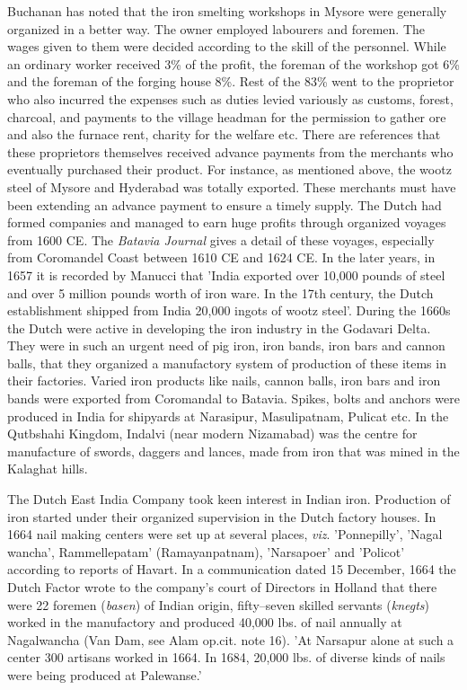 Buchanan has noted that the iron smelting workshops in Mysore were generally organized in a better way. The owner employed labourers and foremen. The wages given to them were decided according to the skill of the personnel. While an ordinary worker received 3\% of the profit, the foreman of the workshop got 6\% and the foreman of the forging house 8\%. Rest of the 83\% went to the proprietor who also incurred the expenses such as duties levied variously as customs, forest, charcoal, and payments to the village headman for the permission to gather ore and also the furnace rent, charity for the welfare etc. There are references that these proprietors themselves received advance payments from the merchants who eventually purchased their product. For instance, as mentioned above, the wootz steel of Mysore and Hyderabad was totally exported. These merchants must have been extending an advance payment to ensure a timely supply. The Dutch had formed companies and managed to earn huge profits through organized voyages from 1600 CE. The \textit{Batavia Journal} gives a detail of these voyages, especially from Coromandel Coast between 1610 CE and 1624 CE. In the later years, in 1657 it is recorded by Manucci that 'India exported over 10,000 pounds of steel and over 5 million pounds worth of iron ware. In the 17th century, the Dutch establishment shipped from India 20,000 ingots of wootz steel'. During the 1660s the Dutch were active in developing the iron industry in the Godavari Delta. They were in such an urgent need of pig iron, iron bands, iron bars and cannon balls, that they organized a manufactory system of production of these items in their factories. Varied iron products like nails, cannon balls, iron bars and iron bands were exported from Coromandal to Batavia. Spikes, bolts and anchors were produced in India for shipyards at Narasipur, Masulipatnam, Pulicat etc. In the Qutbshahi Kingdom, Indalvi (near modern Nizamabad) was the centre for manufacture of swords, daggers and lances, made from iron that was mined in the Kalaghat hills.

The Dutch East India Company took keen interest in Indian iron. Production of iron started under their organized supervision in the Dutch factory houses. In 1664 nail making centers were set up at several places, \textit{viz}. 'Ponnepilly', 'Nagal wancha', Rammellepatam' (Ramayanpatnam), 'Narsapoer' and 'Policot' according to reports of Havart. In a communication dated 15 December, 1664 the Dutch Factor wrote to the company's court of Directors in Holland that there were 22 foremen (\textit{basen}) of Indian origin, fifty–seven skilled servants (\textit{knegts}) worked in the manufactory and produced 40,000 lbs. of nail annually at Nagalwancha (Van Dam, see Alam op.cit. note 16). 'At Narsapur alone at such a center 300 artisans worked in 1664. In 1684, 20,000 lbs. of diverse kinds of nails were being produced at Palewanse.'

